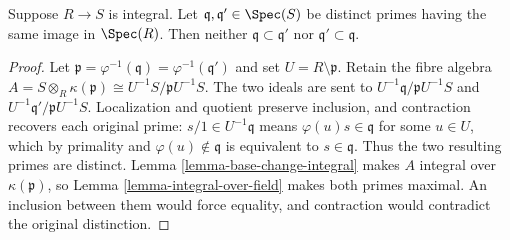 \begin{lemma}
\label{lemma-integral-no-inclusion}
Suppose $R \to S$ is integral.
Let $\mathfrak q, \mathfrak q' \in \Spec(S)$
be distinct primes
having the same image in $\Spec(R)$.
Then neither $\mathfrak q \subset \mathfrak q'$
nor $\mathfrak q' \subset \mathfrak q$.
\end{lemma}

\begin{proof}
Let $\mathfrak p=\varphi^{-1}(\mathfrak q)=
\varphi^{-1}(\mathfrak q')$ and set $U=R\setminus\mathfrak p$.
Retain the fibre algebra
$A=S\otimes_R\kappa(\mathfrak p)\cong U^{-1}S/\mathfrak pU^{-1}S$.
The two ideals are sent to
$U^{-1}\mathfrak q/\mathfrak pU^{-1}S$ and
$U^{-1}\mathfrak q'/\mathfrak pU^{-1}S$. Localization and quotient
preserve inclusion, and contraction recovers each original prime:
$s/1\in U^{-1}\mathfrak q$ means
$\varphi(u)s\in\mathfrak q$ for some $u\in U$, which by primality
and $\varphi(u)\notin\mathfrak q$ is equivalent to $s\in\mathfrak q$.
Thus the two resulting primes are distinct. Lemma
\ref{lemma-base-change-integral} makes $A$ integral over
$\kappa(\mathfrak p)$, so Lemma \ref{lemma-integral-over-field}
makes both primes maximal. An inclusion between them would force
equality, and contraction would contradict the original distinction.
\end{proof}